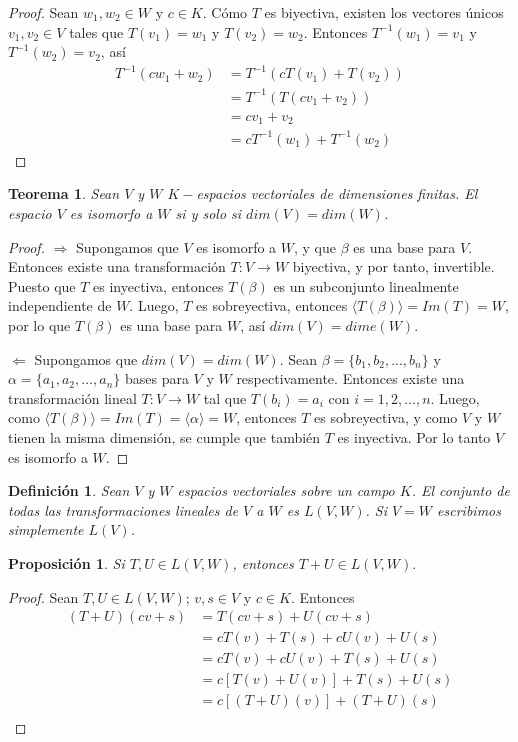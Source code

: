 \documentclass{book}
\newtheorem{theorem}{Teorema}
\newtheorem{proposition}{Proposición}
\newtheorem{definition}{Definición}
\begin{document}
\begin{proof}
Sean $w_1,w_2 \in W$ y $c\in K$. Cómo $T$ es biyectiva, existen los vectores únicos $v_1,v_2 \in V$ tales que $T(v_1)=w_1$ y $T(v_2)=w_2$. Entonces $T^{-1}(w_1)=v_1$ y $T^{-1}(w_2)=v_2$, así
\[
\begin{split}
T^{-1}(cw_1+w_2) &= T^{-1}(cT(v_1)+T(v_2)) \\
&= T^{-1}(T(cv_1+v_2)) \\
&= cv_1+v_2 \\
&= cT^{-1}(w_1)+T^{-1}(w_2)
\end{split}
\]
\end{proof}

\begin{theorem}
Sean $V$ y $W$ $K-$espacios vectoriales de dimensiones finitas. El espacio $V$ es isomorfo a $W$ si y solo si $dim(V)=dim(W)$.
\end{theorem}

\begin{proof}
$\Rightarrow$ Supongamos que $V$ es isomorfo a $W$, y que $\beta$ es una base para $V$. Entonces existe una transformación $T:V\rightarrow W$ biyectiva, y por tanto, invertible. Puesto que $T$ es inyectiva, entonces $T(\beta)$ es un subconjunto linealmente independiente de $W$. Luego, $T$ es sobreyectiva, entonces $\langle T(\beta)\rangle =Im(T)=W$, por lo que $T(\beta)$ es una base para $W$, así $dim(V)=dime(W)$.

$\Leftarrow$ Supongamos que $dim(V)=dim(W)$. Sean $\beta=\{b_1,b_2,...,b_n\}$ y  
$\alpha=\{a_1,a_2,...,a_n\}$ bases para $V$ y $W$ respectivamente. Entonces existe una transformación lineal $T:V\rightarrow W$ tal que $T(b_i)=a_i$ con $i=1,2,...,n$. Luego, como $\langle T(\beta)\rangle =Im(T)=\langle \alpha\rangle =W$, entonces $T$ es sobreyectiva, y como $V$ y $W$ tienen la misma dimensión, se cumple que también $T$ es inyectiva. Por lo tanto $V$ es isomorfo a $W$.
\end{proof}

\begin{definition}
Sean $V$ y $W$ espacios vectoriales sobre un campo $K$. El conjunto de todas las transformaciones lineales de $V$ a $W$ es $L(V,W)$. Si $V=W$ escribimos simplemente $L(V)$.
\end{definition}

\begin{proposition}
Si $T,U \in L(V,W)$, entonces $T+U \in L(V,W).$
\end{proposition}

\begin{proof}
Sean $T,U \in L(V,W)$; $v,s \in V$ y $c \in K$. Entonces
\[
\begin{split}
(T+U)(cv+s) &= T(cv+s)+U(cv+s) \\
&=cT(v)+T(s)+cU(v)+U(s) \\
&=cT(v)+cU(v)+T(s)+U(s) \\
&=c[T(v)+U(v)]+T(s)+U(s) \\
&=c[(T+U)(v)]+(T+U)(s) \\
\end{split}
\]
\end{proof}
\end{document}
